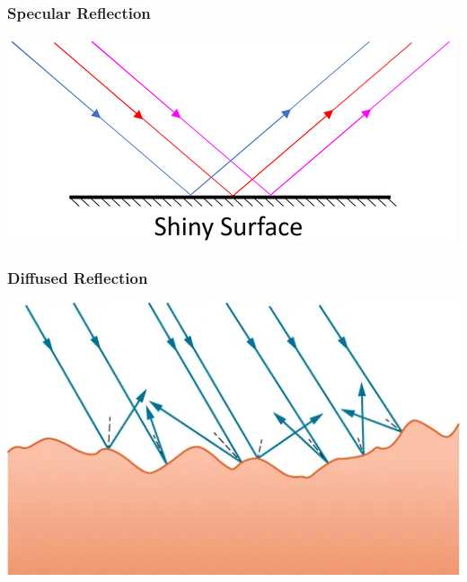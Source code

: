 \documentclass{beamer}
\begin{document}
\begin{frame}
	\frametitle{Specular Reflection}
		\begin{center}
			\includegraphics[scale=0.8]{6.png}
		\end{center}
\end{frame}
\begin{frame}
	\frametitle{Diffused Reflection}
		\begin{center}
			\includegraphics[scale=0.5]{5.png}
		\end{center}
\end{frame}
\end{document}
